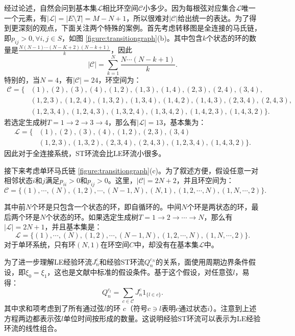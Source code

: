 经过论述，自然会问到基本集$\mathcal{L}$相比环空间$\mathcal{C}$小多少。因为每根弦对应集合$\mathcal{L}$唯一一个元素，有$|\mathcal{L}| = |E\setminus T| = M-N+1$，所以很难对$|\mathcal{C}|$给出统一的表达。为了得到更深刻的观点，下面关注两个特殊的案例。首先考虑转移图是全连接的马氏链，即$p_{ij}>0, \forall i,j \in S$，如图 \ref{figure:transitiongraph}(b)。其中包含$k$个状态的环的数量是$\frac{N (N-1) \cdots (N-K+2)(N-k+1)}{k}$，因此
\begin{equation*}
    |\mathcal{C}| = \sum_{k=1}^N\frac{N\cdots (N-k+1)}{k}.
\end{equation*}
特别的，当$N=4$，有$|\mathcal{C}|=24$，环空间为：
\begin{align*}
    \mathcal{C} = \{&(1),(2),(3),(4),(1,2),(1,3),(1,4),(2,3),(2,4),(3,4),\\
    &(1,2,3),(1,2,4),(1,3,2),(1,3,4),(1,4,2),(1,4,3),(2,3,4),(2,4,3),\\
    &(1,2,3,4),(1,2,4,3),(1,3,2,4),(1,3,4,2),(1,4,2,3),(1,4,3,2)\}.
\end{align*}
若选定生成树$T = 1\to 2\to 3\to 4$，那么有$|\mathcal{L}|=13$，基本集为：
\begin{align*}
    \mathcal{L} = \{&(1),(2),(3),(4),(1,2),(2,3),(3,4)\\
    &(1,2,3),(1,3,2),(2,3,4),(2,4,3),(1,2,3,4),(1,4,3,2)\}.
\end{align*}
因此对于全连接系统，ST环流会比LE环流小很多。

接下来考虑单环马氏链 \ref{figure:transitiongraph}(c)。为了叙述方便，假设任意一对相邻状态$i$和$j$满足$p_{ii}>0$和$p_{ij}>0$。这里，$|\mathcal{C}| = 2N +2$，并且环空间为：
\begin{equation}\label{cycle_space}
    \mathcal{C} = \{(1),\cdots,(N),(1,2),\cdots,(N-1,N),(N,1),(1,2,\cdots,N),(1,N,\cdots,2)\}.
\end{equation}

其中前$N$个环是只包含一个状态的环，即自循环的。中间$N$个环是两状态的环，最后两个环是$N$个状态的环。如果选定生成树$T = 1\to 2\to\cdots \to N$，那么有$|\mathcal{L}| = 2N + 1$，并且基本集是：
\begin{equation*}
    \mathcal{L} = \{(1),\cdots,(N),(1,2),\cdots,(N-1,N),(1,2,\cdots,N),(1,N,\cdots,2)\}.
\end{equation*}
对于单环系统，只有环$(N, 1)$在环空间$C$中，却没有在基本集$\mathcal{L}$中。

为了进一步理解LE经验环流$J_n^c$和经验ST环流$Q_n^{c_N}$的关系，面使用周期边界条件假设，即$\xi_0 = \xi_1$，这也是文献\cite{den2000large}中标准的假设条件。基于这个假设，对任意弦$l$，易得：
\begin{equation}\label{conversion}
    Q_n^{c_l} = \sum_{c\in\mathcal{C}}J^c_n1_{\{l\in c\}}.
\end{equation}
其中求和项考虑到了所有通过弦$l$的环 $c$（符号$c \ni l$表明$c$通过状态$i$）。注意到上述方程两边都表示弦$l$单位时间按形成的数量。这说明经验ST环流可以表示为LE经验环流的线性组合。
